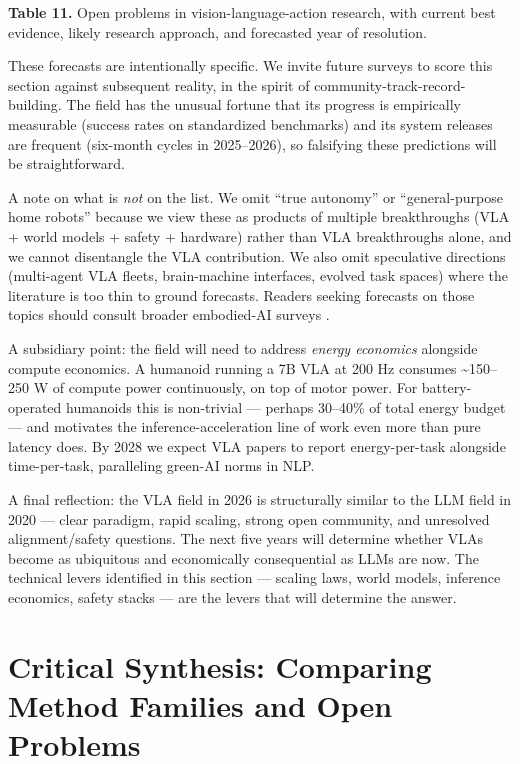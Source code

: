 \documentclass{article}
\begin{document}
\textbf{Table 11.} Open problems in vision-language-action research, with current best evidence, likely research approach, and forecasted year of resolution.

These forecasts are intentionally specific. We invite future surveys to score this section against subsequent reality, in the spirit of community-track-record-building. The field has the unusual fortune that its progress is empirically measurable (success rates on standardized benchmarks) and its system releases are frequent (six-month cycles in 2025--2026), so falsifying these predictions will be straightforward.

A note on what is \emph{not} on the list. We omit ``true autonomy'' or ``general-purpose home robots'' because we view these as products of multiple breakthroughs (VLA + world models + safety + hardware) rather than VLA breakthroughs alone, and we cannot disentangle the VLA contribution. We also omit speculative directions (multi-agent VLA fleets, brain-machine interfaces, evolved task spaces) where the literature is too thin to ground forecasts. Readers seeking forecasts on those topics should consult broader embodied-AI surveys \cite{liu2024aligningcyberspace,hou2026asurveyonevaluatio}.

A subsidiary point: the field will need to address \emph{energy economics} alongside compute economics. A humanoid running a 7B VLA at 200 Hz consumes \textasciitilde150--250 W of compute power continuously, on top of motor power. For battery-operated humanoids this is non-trivial --- perhaps 30--40\% of total energy budget --- and motivates the inference-acceleration line of work even more than pure latency does. By 2028 we expect VLA papers to report energy-per-task alongside time-per-task, paralleling green-AI norms in NLP.

A final reflection: the VLA field in 2026 is structurally similar to the LLM field in 2020 --- clear paradigm, rapid scaling, strong open community, and unresolved alignment/safety questions. The next five years will determine whether VLAs become as ubiquitous and economically consequential as LLMs are now. The technical levers identified in this section --- scaling laws, world models, inference economics, safety stacks --- are the levers that will determine the answer.

\section{Critical Synthesis: Comparing Method Families and Open Problems}\label{critical-synthesis-comparing-method-families-and-open-problems}
\end{document}

